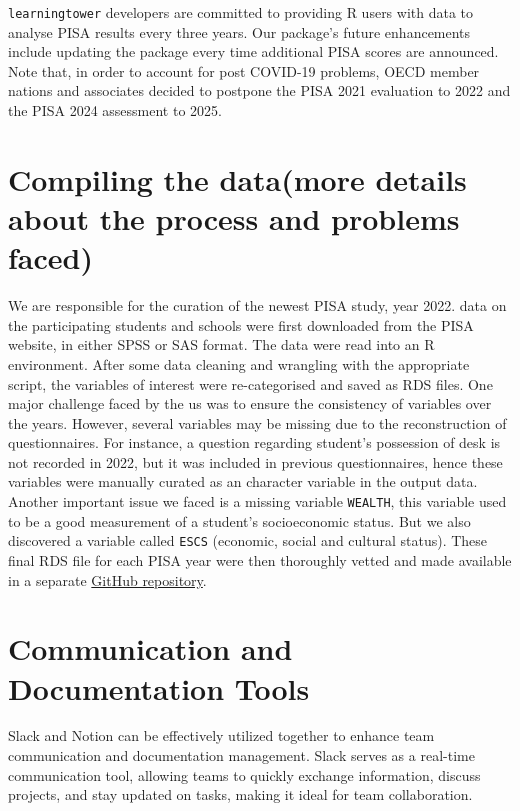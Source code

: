 \documentclass[
  11pt,
  a4paper,
]{article}
\begin{document}
\texttt{learningtower} developers are committed to providing R users
with data to analyse PISA results every three years. Our package's
future enhancements include updating the package every time additional
PISA scores are announced. Note that, in order to account for post
COVID-19 problems, OECD member nations and associates decided to
postpone the PISA 2021 evaluation to 2022 and the PISA 2024 assessment
to 2025.

\section{Compiling the data(more details about the process and problems
faced)}\label{compiling-the-datamore-details-about-the-process-and-problems-faced}

We are responsible for the curation of the newest PISA study, year 2022.
data on the participating students and schools were first downloaded
from the PISA website, in either SPSS or SAS format. The data were read
into an R environment. After some data cleaning and wrangling with the
appropriate script, the variables of interest were re-categorised and
saved as RDS files. One major challenge faced by the us was to ensure
the consistency of variables over the years. However, several variables
may be missing due to the reconstruction of questionnaires. For
instance, a question regarding student's possession of desk is not
recorded in 2022, but it was included in previous questionnaires, hence
these variables were manually curated as an character variable in the
output data. Another important issue we faced is a missing variable
\texttt{WEALTH}, this variable used to be a good measurement of a
student's socioeconomic status. But we also discovered a variable called
\texttt{ESCS} (economic, social and cultural status). These final RDS
file for each PISA year were then thoroughly vetted and made available
in a separate
\href{https://github.com/kevinwang09/learningtower_masonry}{GitHub
repository}.

\section{Communication and Documentation
Tools}\label{communication-and-documentation-tools}

Slack and Notion can be effectively utilized together to enhance team
communication and documentation management. Slack serves as a real-time
communication tool, allowing teams to quickly exchange information,
discuss projects, and stay updated on tasks, making it ideal for team
collaboration.
\end{document}
